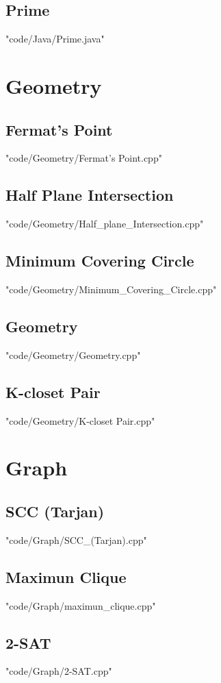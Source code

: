 \documentclass [landscape,8pt,a4paper,twocolumn]{article}
\begin{document}
\subsection{Prime}
 {"code/Java/Prime.java"}
\section{Geometry}
\subsection{Fermat's Point}
 {"code/Geometry/Fermat's Point.cpp"}
\subsection{Half Plane Intersection}
 {"code/Geometry/Half_plane_Intersection.cpp"}
\subsection{Minimum Covering Circle}
 {"code/Geometry/Minimum_Covering_Circle.cpp"}
\subsection{Geometry}
 {"code/Geometry/Geometry.cpp"}
\subsection{K-closet Pair}
 {"code/Geometry/K-closet Pair.cpp"}
\section{Graph}
\subsection{SCC (Tarjan)}
 {"code/Graph/SCC_(Tarjan).cpp"}
\subsection{Maximun Clique}
 {"code/Graph/maximun_clique.cpp"}
\subsection{2-SAT}
 {"code/Graph/2-SAT.cpp"}
\end{document}
